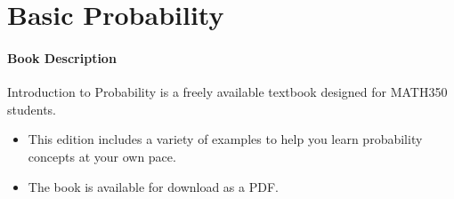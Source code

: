 \documentclass[
  12pt,
]{krantzNoCorner}
\providecommand{\tightlist}{%
  \setlength{\itemsep}{0pt}\setlength{\parskip}{0pt}}
\begin{document}
\hypertarget{basic-probability}{%
\chapter{Basic Probability}\label{basic-probability}}

\hypertarget{book-description}{%
\subsubsection*{Book Description}\label{book-description}}


Introduction to Probability is a freely available textbook designed for MATH350 students.

\begin{itemize}
\tightlist
\item
  This edition includes a variety of examples to help you learn probability concepts at your own pace.
\item
  The book is available for download as a PDF.
\end{itemize}
\end{document}
